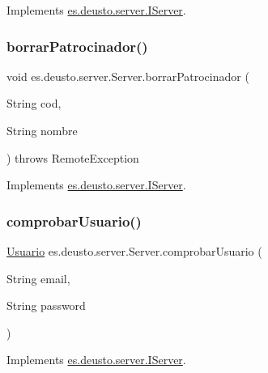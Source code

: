 Implements \mbox{\hyperlink{interfacees_1_1deusto_1_1server_1_1_i_server_ac833d9018ade9c49677942317f270046}{es.\+deusto.\+server.\+I\+Server}}.

\mbox{\label{classes_1_1deusto_1_1server_1_1_server_ae8d6c0fcd5fd2412451c9abcd7927b3d}} 
\subsubsection{\texorpdfstring{borrarPatrocinador()}{borrarPatrocinador()}}
{\footnotesize\ttfamily void es.\+deusto.\+server.\+Server.\+borrar\+Patrocinador (\begin{DoxyParamCaption}\item[{String}]{cod,  }\item[{String}]{nombre }\end{DoxyParamCaption}) throws Remote\+Exception}



Implements \mbox{\hyperlink{interfacees_1_1deusto_1_1server_1_1_i_server_a905d4eb57bc276240c23f5ebb0f08bea}{es.\+deusto.\+server.\+I\+Server}}.

\mbox{\label{classes_1_1deusto_1_1server_1_1_server_afa3e758715cbf321f9c1cbe08a8583a4}} 
\subsubsection{\texorpdfstring{comprobarUsuario()}{comprobarUsuario()}}
{\footnotesize\ttfamily \mbox{\hyperlink{classes_1_1deusto_1_1server_1_1jdo_1_1_usuario}{Usuario}} es.\+deusto.\+server.\+Server.\+comprobar\+Usuario (\begin{DoxyParamCaption}\item[{String}]{email,  }\item[{String}]{password }\end{DoxyParamCaption})}



Implements \mbox{\hyperlink{interfacees_1_1deusto_1_1server_1_1_i_server_a864d05d99ec3891208c39d8352221656}{es.\+deusto.\+server.\+I\+Server}}.

